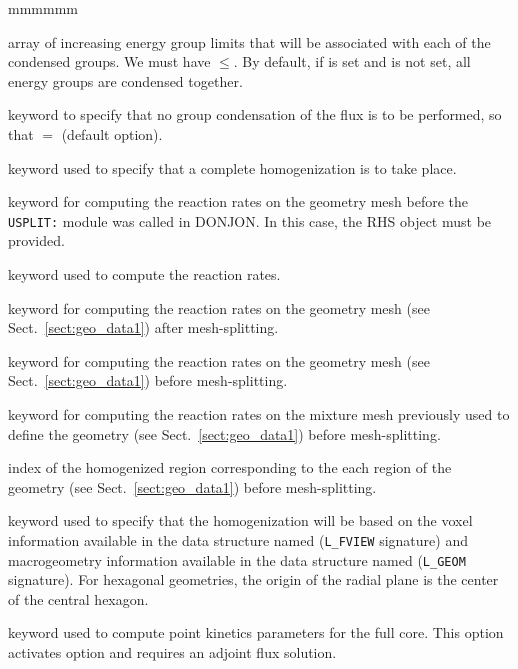 \begin{ListeDeDescription}{mmmmmm}
\item[\dusa{icond}] array of increasing energy group limits that will be associated with
each of the  condensed groups. We must have $\le$. By default, if  is set
and  is not set, all energy groups are condensed together.

\item[\moc{NONE}] keyword to specify that no group condensation of the flux is
to be performed, so that $=$ (default option).

\item[\moc{COMP}] keyword used to specify that a complete homogenization is to take place. 

\item[\moc{MATX}] keyword for computing the reaction rates on the geometry mesh before the {\tt USPLIT:} module was called in DONJON. In this case, the RHS object  must be provided.

\item[\moc{INTG}] keyword used to compute the reaction rates.

\item[\moc{NONE}] keyword for computing the reaction rates on the geometry mesh (see Sect.~\ref{sect:geo_data1}) after mesh-splitting.

\item[\moc{IN}] keyword for computing the reaction rates on the geometry mesh (see Sect.~\ref{sect:geo_data1}) before mesh-splitting.

\item[\moc{MIX}] keyword for computing the reaction rates on the mixture mesh previously used to define the geometry (see Sect.~\ref{sect:geo_data1}) before mesh-splitting.

\item[\dusa{ihom}] index of the homogenized region corresponding to the each region of the geometry (see Sect.~\ref{sect:geo_data1}) before mesh-splitting.

\item[\moc{VAL}] keyword used to specify that the homogenization will be based on the voxel information available in the data structure named  ({\tt L\_FVIEW} signature) and macrogeometry information available in the data structure named  ({\tt L\_GEOM} signature). For
hexagonal geometries, the origin of the radial plane is the center of the central hexagon.

\item[\moc{PKIN}] keyword used to compute point kinetics parameters for the full core. This option activates option  and requires an adjoint flux solution.

\end{ListeDeDescription}
\clearpage

